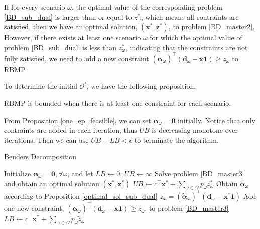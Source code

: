 If for every scenario $\omega$, the optimal value of the corresponding problem \eqref{BD_sub_dual} is larger than or equal to $z_{\omega}^{*}$, which means all contraints are satisfied, then we have an optimal solution, $(\mathbf{x}^{*}, \mathbf{z}^{*})$, to problem \eqref{BD_master2}. However, if there exists at least one scenario $\omega$ for which the optimal value of problem \eqref{BD_sub_dual} is less than $z_{\omega}^{*}$, indicating that the constraints are not fully satisfied, we need to add a new constraint $(\bm{\tilde{\alpha}}_{\omega})^{\intercal}(\mathbf{d}_{\omega} - \mathbf{x} \mathbf{1}) \geq z_{\omega}$ to RBMP.


To determine the initial $\mathcal{O}^{t}$, we have the following proposition.

\begin{prop}\label{one_ep_feasible}
RBMP is bounded when there is at least one constraint for each scenario.
\end{prop}

From Proposition \ref{one_ep_feasible}, we can set $\bm{\alpha}_{\omega} = \mathbf{0}$ initially. Notice that only contraints are added in each iteration, thus $UB$ is decreasing monotone over iterations. Then we can use $UB - LB < \epsilon$ to terminate the algorithm.

\begin{algorithm}[h]
  \caption{Benders Decomposition}\label{cut_algo}
  Initialize $\bm{\alpha}_{\omega} = \mathbf{0}, \forall \omega$, and let $LB \gets 0$, $UB \gets \infty$\;
    {Solve problem \eqref{BD_master3} and obtain an optimal solution $(\mathbf{x}^{*}, \mathbf{z}^{*})$\;
    $UB \gets c^{\intercal} \mathbf{x}^{*} + \sum_{\omega \in \Omega} p_{\omega} z_{\omega}^{*}$\;
    {Obtain $\bm{\tilde{\alpha}}_{\omega}$ according to Proposition \ref{optimal_sol_sub_dual}\; $\tilde{z}_{\omega}= (\bm{\tilde{\alpha}}_{\omega})^{\intercal}(\mathbf{d}_{\omega}- \mathbf{x}^{*} \mathbf{1})$\;
    {Add one new constraint, $(\bm{\tilde{\alpha}}_{\omega})^{\intercal}(\mathbf{d}_{\omega}- \mathbf{x} \mathbf{1}) \geq z_{\omega}$, to problem \eqref{BD_master3}\;}
    }
    {$LB \gets c^{\intercal} \mathbf{x}^{*} + \sum_{\omega \in \Omega} p_{\omega} \tilde{z}_{\omega} $\;}
    }
\end{algorithm}

